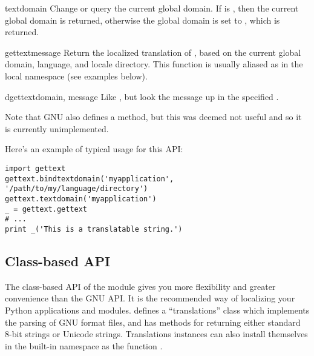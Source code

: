 \begin{funcdesc}{textdomain}{}
Change or query the current global domain.  If  is
, then the current global domain is returned, otherwise the
global domain is set to , which is returned.
\end{funcdesc}

\begin{funcdesc}{gettext}{message}
Return the localized translation of , based on the
current global domain, language, and locale directory.  This function
is usually aliased as \function{_} in the local namespace (see
examples below).
\end{funcdesc}

\begin{funcdesc}{dgettext}{domain, message}
Like , but look the message up in the specified
.
\end{funcdesc}

Note that GNU  also defines a 
method, but this was deemed not useful and so it is currently
unimplemented.

Here's an example of typical usage for this API:

\begin{verbatim}
import gettext
gettext.bindtextdomain('myapplication', '/path/to/my/language/directory')
gettext.textdomain('myapplication')
_ = gettext.gettext
# ...
print _('This is a translatable string.')
\end{verbatim}

\subsection{Class-based API}

The class-based API of the  module gives you more
flexibility and greater convenience than the GNU 
API.  It is the recommended way of localizing your Python applications and
modules.   defines a ``translations'' class which
implements the parsing of GNU  format files, and has methods
for returning either standard 8-bit strings or Unicode strings.
Translations instances can also install themselves in the built-in
namespace as the function \function{_()}.


